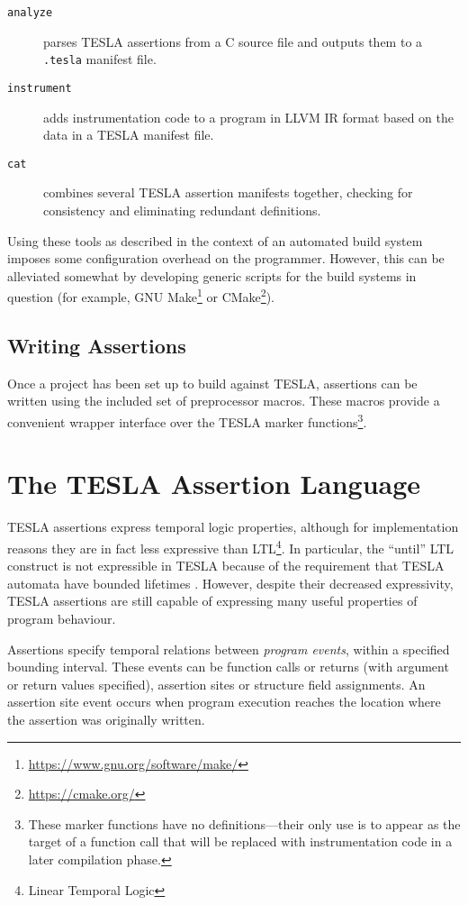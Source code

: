 \begin{description}
  \item[\texttt{analyze}] parses TESLA assertions from a C source file and
    outputs them to a \texttt{.tesla} manifest file.
  \item[\texttt{instrument}] adds instrumentation code to a program in LLVM IR
    format based on the data in a TESLA manifest file.
  \item[\texttt{cat}] combines several TESLA assertion manifests together,
    checking for consistency and eliminating redundant definitions.
\end{description}

Using these tools as described in the context of an automated build system
imposes some configuration overhead on the programmer. However, this can be
alleviated somewhat by developing generic scripts for the build systems in
question (for example, GNU
Make\footnote{\url{https://www.gnu.org/software/make/}} or
CMake\footnote{\url{https://cmake.org/}}).

\subsection{Writing Assertions}

Once a project has been set up to build against TESLA, assertions can be written
using the included set of preprocessor macros. These macros provide a convenient
wrapper interface over the TESLA marker functions\footnote{These marker
functions have no definitions---their only use is to appear as the target of a
function call that will be replaced with instrumentation code in a later
compilation phase.}.

\section{The TESLA Assertion Language} \label{sec:assertions}

TESLA assertions express temporal logic properties, although for implementation
reasons they are in fact less expressive than LTL\footnote{Linear Temporal
Logic}. In particular, the ``until'' LTL construct \cite{pnueli_temporal_1977} is
not expressible in TESLA because of the requirement that TESLA automata have
bounded lifetimes \cite{anderson_tesla:_2014}. However, despite their decreased
expressivity, TESLA assertions are still capable of expressing many useful
properties of program behaviour.

Assertions specify temporal relations between \emph{program events}, within a
specified bounding interval. These events can be function calls or returns (with
argument or return values specified), assertion sites or structure field
assignments. An assertion site event occurs when program execution reaches the
location where the assertion was originally written.

